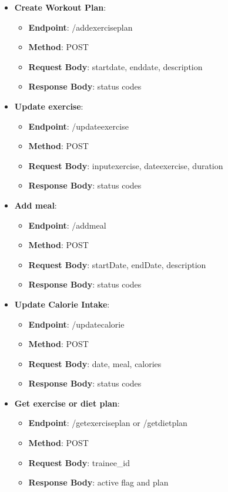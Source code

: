 \documentclass{article}
\begin{document}
\begin{itemize}
\item \textbf{Create Workout Plan}:
\begin{itemize}
\item \textbf{Endpoint}: /addexerciseplan
\item \textbf{Method}: POST
\item \textbf{Request Body}: {startdate, enddate, description}
\item \textbf{Response Body}: {status codes}
\end{itemize}

\item \textbf{Update exercise}:
\begin{itemize}
\item \textbf{Endpoint}: /updateexercise
\item \textbf{Method}: POST
\item \textbf{Request Body}: {inputexercise, dateexercise, duration}
\item \textbf{Response Body}: {status codes}
\end{itemize}

\item \textbf{Add meal}:
\begin{itemize}
\item \textbf{Endpoint}: /addmeal
\item \textbf{Method}: POST
\item \textbf{Request Body}: {startDate, endDate, description}
\item \textbf{Response Body}: {status codes}
\end{itemize}


\item \textbf{Update Calorie Intake}:
\begin{itemize}
\item \textbf{Endpoint}: /updatecalorie
\item \textbf{Method}: POST
\item \textbf{Request Body}: {date, meal, calories}
\item \textbf{Response Body}: {status codes}
\end{itemize}

\item \textbf{Get exercise or diet plan}:
\begin{itemize}
\item \textbf{Endpoint}: /getexerciseplan or /getdietplan
\item \textbf{Method}: POST
\item \textbf{Request Body}: {trainee\_id}
\item \textbf{Response Body}: {active flag and plan}
\end{itemize}



\end{itemize}
\end{document}
